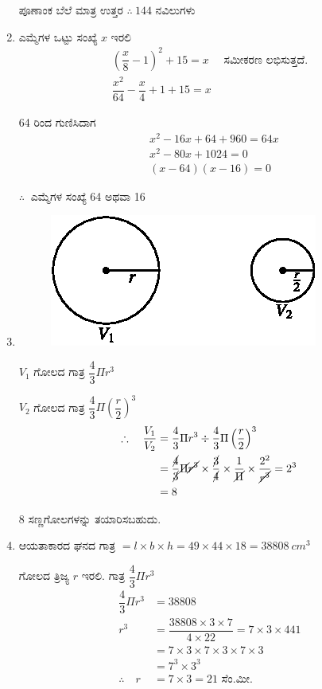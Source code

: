 \begin{enumerate}
ಪೂಣಾಂಕ ಬೆಲೆ ಮಾತ್ರ ಉತ್ತರ $\therefore~ 144$ ನವಿಲುಗಳು 

\item ಎಮ್ಮೆಗಳ ಒಟ್ಟು ಸಂಖ್ಯೆ $x$ ಇರಲಿ 
\begin{gather*}
\left(\dfrac{x}{8} - 1\right)^{2} + 15 = x \quad\text{ ಸಮೀಕರಣ ಲಭಿಸುತ್ತದೆ.}\\
\dfrac{x^{2}}{64} - \dfrac{x}{4} + 1 + 15 = x
\end{gather*}

64 ರಿಂದ ಗುಣಿಸಿದಾಗ 
\begin{align*}
& x^{2} - 16x + 64 + 960 = 64x\\
& x^{2} - 80x + 1024 = 0\\
& (x - 64) (x - 16) = 0
\end{align*}

$\therefore~$ ಎಮ್ಮೆಗಳ ಸಂಖ್ಯೆ 64 ಅಥವಾ  16

\item 
\begin{figure}[H]
\centering
\includegraphics{images/chap11/ans20.eps}
\end{figure}

$V_{1}$ ಗೋಲದ ಗಾತ್ರ $\dfrac{4}{3} \Pi r^{3}$

$V_{2}$ ಗೋಲದ ಗಾತ್ರ $\dfrac{4}{3} \Pi \left(\dfrac{r}{2}\right)^{3}$
\begin{align*}
\therefore\quad\dfrac{V_{1}}{V_{2}} & = \dfrac{4}{3}\Pi r^{3} \div {\dfrac{4}{3}\Pi \left(\dfrac{r}{2}\right)^{3}}\\
& = \dfrac{\cancel{4}}{\cancel{3}} \cancel{\Pi} \cancel{r^{3}} \times \dfrac{\cancel{3}}{\cancel{4}} \times \dfrac{1}{\cancel{\Pi}} \times \dfrac{2^{2}}{\cancel{r^{3}}} = 2^{3}\\
& = 8
\end{align*}

8 ಸಣ್ಣಗೋಲಗಳನ್ನು ತಯಾರಿಸಬಹುದು. 

\item ಆಯತಾಕಾರದ ಘನದ ಗಾತ್ರ $= l\times b\times h = 49\times 44\times 18 = 38808~cm^{3}$

ಗೋಲದ ತ್ರಿಜ್ಯ $r$ ಇರಲಿ. ಗಾತ್ರ $\dfrac{4}{3} \Pi r^{3}$
\begin{align*}
\dfrac{4}{3} \Pi r^{3} & = 38808\\
r^{3} & = \dfrac{38808\times 3\times 7}{4\times 22} = 7\times 3\times 441\\
& = 7\times 3\times 7\times 3\times 7\times 3\\
& = 7^{3}\times 3^{3}\\
\therefore\quad r & = 7\times 3 = 21 \text{ ಸೆಂ.ಮೀ.}
\end{align*}


\end{enumerate}
